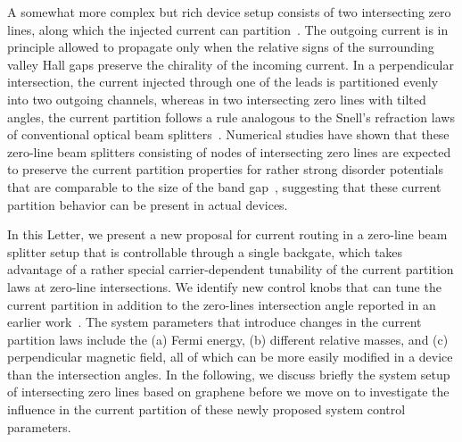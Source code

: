 \documentclass[journal=nalefd,manuscript=communication]{achemso}
\begin{document}
A somewhat more complex but rich device setup consists of  two intersecting zero lines, along which the injected current can partition~\cite{Highway}. The outgoing current is in principle allowed to propagate only when the relative signs of the surrounding valley Hall gaps preserve the chirality of the incoming current. In a perpendicular intersection, the current injected through one of the leads is partitioned evenly into two outgoing channels, whereas in two intersecting zero lines with tilted angles, the current partition follows a rule analogous to the Snell's refraction laws of conventional optical beam splitters~\cite{partition}. Numerical studies have shown that these zero-line beam splitters consisting of nodes of intersecting zero lines are expected to preserve the current partition properties for rather strong disorder potentials that are comparable to the size of the band gap~\cite{Highway}, suggesting that these current partition behavior can be present in actual devices.

In this Letter, we present a new proposal for current routing in a zero-line beam splitter setup that is controllable through a single backgate, which takes advantage of a rather special carrier-dependent tunability of the current partition laws at zero-line intersections. We identify new control knobs that can tune the current partition in addition to the zero-lines intersection angle reported in an earlier work~\cite{partition}.
The system parameters that introduce changes in the current partition laws include the (a) Fermi energy, (b) different relative masses, and (c) perpendicular magnetic field, all of which can be more easily modified in a device than the intersection angles. In the following, we discuss briefly the system setup of intersecting zero lines based on graphene before we move on to investigate the influence in the current partition of these newly proposed system control parameters.
\end{document}
